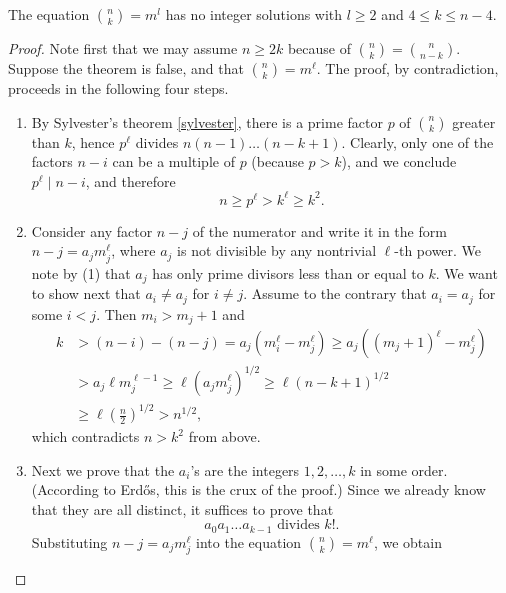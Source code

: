 \begin{theorem}
    \label{binomial_never_powers}
    \leanok
    The equation \(\binom n k = m ^ l\) has no integer solutions with
    \(l \ge 2\) and \(4 \le k \le n - 4\).
\end{theorem}
\begin{proof}
    Note first that we may assume \(n \geq 2k\) because of \(\binom{n}{k} = \binom{n}{n-k}\).
    Suppose the theorem is false, and that \(\binom{n}{k} = m^\ell\).
    The proof, by contradiction, proceeds in the following four steps.
    \begin{enumerate}
    \item By Sylvester's theorem \ref{sylvester}, there is a prime factor \(p\) of \(\binom{n}{k}\) greater than \(k\),
          hence \(p^\ell\) divides \(n(n - 1) \dots (n - k + 1)\). Clearly, only one of the factors \(n - i\)
          can be a multiple of \(p\) (because \(p > k\)), and we conclude \(p^\ell \mid n - i\), and therefore
          \[
          n \geq p^\ell > k^\ell \geq k^2.
          \]
    \item Consider any factor \(n - j\) of the numerator and write it in the form \(n - j = a_j m_j^\ell\),
          where \(a_j\) is not divisible by any nontrivial \(\ell\)-th power.
          We note by (1) that \(a_j\) has only prime divisors less than or equal to \(k\).
          We want to show next that \(a_i \neq a_j\) for \(i \neq j\).
          Assume to the contrary that \(a_i = a_j\) for some \(i < j\). Then \(m_i > m_j + 1\) and
        \begin{align}
        k & > (n - i) - (n - j) = a_j(m_i^\ell - m_j^\ell) \geq a_j((m_j + 1)^\ell - m_j^\ell)\\
          & > a_j \ell m_j^{\ell-1} \geq \ell (a_j m_j^\ell)^{1/2} \geq \ell (n - k + 1)^{1/2}\\
          & \geq \ell \left(\frac{n}{2}\right)^{1/2} > n^{1/2},
        \end{align}
        which contradicts \(n > k^2\) from above.
    \item Next we prove that the \(a_i\)'s are the integers \(1, 2, \dots, k\) in some order.
    (According to Erdős, this is the crux of the proof.)
    Since we already know that they are all distinct, it suffices to prove that
   \[
   a_0 a_1 \dots a_{k-1} \text{ divides } k!.
   \]
   Substituting \(n - j = a_j m_j^\ell\) into the equation \(\binom{n}{k} = m^\ell\), we obtain

\end{enumerate}
\end{proof}
